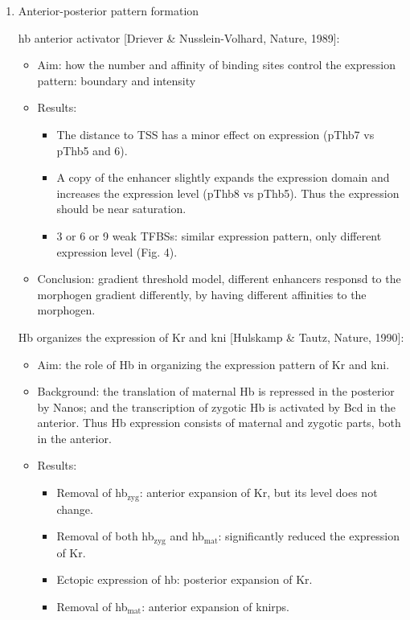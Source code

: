 \documentclass{report}
\begin{document}
\begin{enumerate}
	\item{Anterior-posterior pattern formation}
	
	hb anterior activator [Driever \& Nusslein-Volhard, Nature, 1989]:
	\begin{itemize}
		\item Aim: how the number and affinity of binding sites control the expression pattern: boundary and intensity
		
		\item Results: 
		\begin{itemize}
			\item The distance to TSS has a minor effect on expression (pThb7 vs pThb5 and 6). 
			\item A copy of the enhancer slightly expands the expression domain and increases the expression level (pThb8 vs pThb5). Thus the expression should be near saturation. 
			\item 3 or 6 or 9 weak TFBSs: similar expression pattern, only different expression level (Fig. 4). 
		\end{itemize}
		
		\item Conclusion: gradient threshold model, different enhancers responsd to the morphogen gradient differently, by having different affinities to the morphogen. 
	\end{itemize}
	
	Hb organizes the expression of Kr and kni [Hulskamp \& Tautz, Nature, 1990]:
	\begin{itemize}
		\item Aim: the role of Hb in organizing the expression pattern of Kr and kni. 
		
		\item Background: the translation of maternal Hb is repressed in the posterior by Nanos; and the transcription of zygotic Hb is activated by Bcd in the anterior. Thus Hb expression consists of maternal and zygotic parts, both in the anterior. 
		
		\item Results: 
		\begin{itemize}
			\item Removal of hb$_\text{zyg}$: anterior expansion of Kr, but its level does not change. 
			\item Removal of both hb$_\text{zyg}$ and hb$_\text{mat}$: significantly reduced the expression of Kr. 
			\item Ectopic expression of hb: posterior expansion of Kr. 
			\item Removal of hb$_\text{mat}$: anterior expansion of knirps. 
		\end{itemize}
		

\end{itemize}
\end{enumerate}
\end{document}
